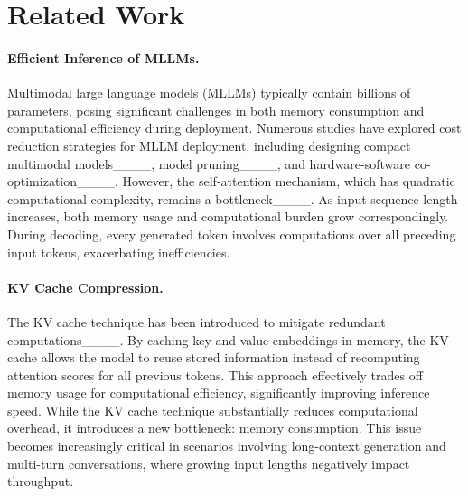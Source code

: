 \section{Related Work}
\paragraph{Efficient Inference of MLLMs.}
Multimodal large language models (MLLMs) typically contain billions of parameters, posing significant challenges in both memory consumption and computational efficiency during deployment. Numerous studies have explored cost reduction strategies for MLLM deployment, including designing compact multimodal models____, model pruning____, and hardware-software co-optimization____. However, the self-attention mechanism, which has quadratic computational complexity, remains a bottleneck____. As input sequence length increases, both memory usage and computational burden grow correspondingly. During decoding, every generated token involves computations over all preceding input tokens, exacerbating inefficiencies.

\paragraph{KV Cache Compression.}
The KV cache technique has been introduced to mitigate redundant computations____. By caching key and value embeddings in memory, the KV cache allows the model to reuse stored information instead of recomputing attention scores for all previous tokens. This approach effectively trades off memory usage for computational efficiency, significantly improving inference speed. 
While the KV cache technique substantially reduces computational overhead, it introduces a new bottleneck: memory consumption. This issue becomes increasingly critical in scenarios involving long-context generation and multi-turn conversations, where growing input lengths negatively impact throughput.

